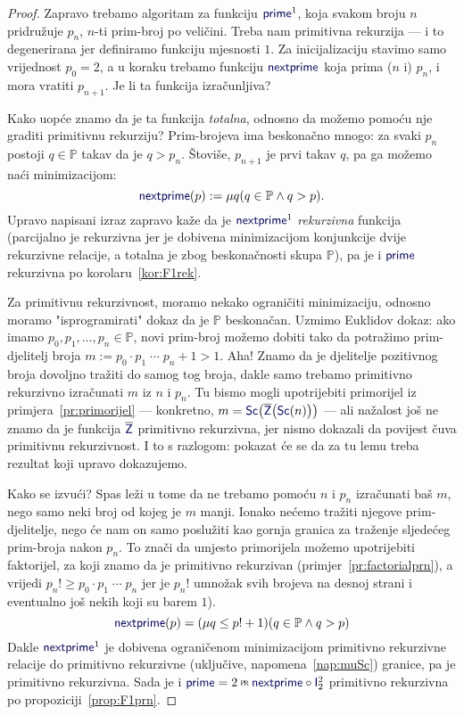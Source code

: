 \begin{proof}
    Zapravo trebamo algoritam za funkciju $\f{prime}^1$, koja svakom broju $n$ pridružuje $p_n$, $n$-ti prim-broj po veličini. Treba nam primitivna rekurzija --- i to degenerirana jer definiramo funkciju mjesnosti $1$. Za inicijalizaciju stavimo samo vrijednost $p_0=2$, a u koraku trebamo funkciju $\f{nextprime}$ koja prima ($n$ i) $p_n$, i mora vratiti $p_{n+1}$. Je li ta funkcija izračunljiva?

Kako uopće znamo da je ta funkcija \emph{totalna}, odnosno da možemo pomoću nje graditi primitivnu rekurziju? Prim-brojeva ima beskonačno mnogo: za svaki $p_n$ postoji $q\in\mathbb P$ takav da je $q>p_n$. Štoviše, $p_{n+1}$ je prvi takav $q$, pa ga možemo naći minimizacijom:
\begin{equation}\label{eq:primerek}
    \f{nextprime}(p):=\mu q(q\in\mathbb P\land q>p)\text.
\end{equation}
Upravo napisani izraz zapravo kaže da je $\f{nextprime}^1$ \emph{rekurzivna} funkcija (parcijalno je rekurzivna jer je dobivena minimizacijom konjunkcije dvije rekurzivne relacije, a totalna je zbog beskonačnosti skupa $\mathbb P$), pa je i $\f{prime}$ rekurzivna po korolaru~\ref{kor:F1rek}.

    Za primitivnu rekurzivnost, moramo nekako ograničiti minimizaciju, odnosno moramo "isprogramirati" dokaz da je $\mathbb P$ beskonačan. Uzmimo Euklidov dokaz: ako imamo $p_0,p_1,\dotsc,p_n\in\mathbb P$, novi prim-broj možemo dobiti tako da potražimo prim-djelitelj broja $m:=p_0\cdot p_1\mathbin{\dotsm}p_n+1>1$. Aha! Znamo da je djelitelje pozitivnog broja dovoljno tražiti do samog tog broja, dakle samo trebamo primitivno rekurzivno izračunati $m$ iz $n$ i $p_n$. Tu bismo mogli upotrijebiti primorijel iz primjera~\ref{pr:primorijel} --- konkretno, $m=\f{Sc}\bigl(\overline{\f Z}\bigl(\f{Sc}(n)\bigr)\bigr)$ --- ali nažalost još ne znamo da je funkcija $\overline{\f Z}$ primitivno rekurzivna, jer nismo dokazali da povijest čuva primitivnu rekurzivnost. I to s razlogom: pokazat će se da za tu lemu treba rezultat koji upravo dokazujemo.

    Kako se izvući? Spas leži u tome da ne trebamo pomoću $n$ i $p_n$ izračunati baš $m$, nego samo neki broj od kojeg je $m$ manji. Ionako nećemo tražiti njegove prim-djelitelje, nego će nam on samo poslužiti kao gornja granica za traženje sljedećeg prim-broja nakon $p_n$. To znači da umjesto primorijela možemo upotrijebiti faktorijel, za koji znamo da je primitivno rekurzivan (primjer~\ref{pr:factorialprn}), a vrijedi $p_n!\ge p_0\cdot p_1\mathbin{\dotsm}p_n$ jer je $p_n!$ umnožak svih brojeva na desnoj strani i eventualno još nekih koji su barem $1$).
\begin{equation}
    \f{nextprime}(p)=(\mu q\le p!+1)(q\in\mathbb P\land q>p)%
\end{equation}
    Dakle $\f{nextprime}^1$ je dobivena ograničenom minimizacijom primitivno rekurzivne relacije do primitivno rekurzivne (uključive, napomena~\ref{nap:muSc}) granice, pa je primitivno rekurzivna. Sada je i $\f{prime}=2\pr\f{nextprime}\circ\f I_2^2$ primitivno rekurzivna po propoziciji~\ref{prop:F1prn}.
\end{proof}

